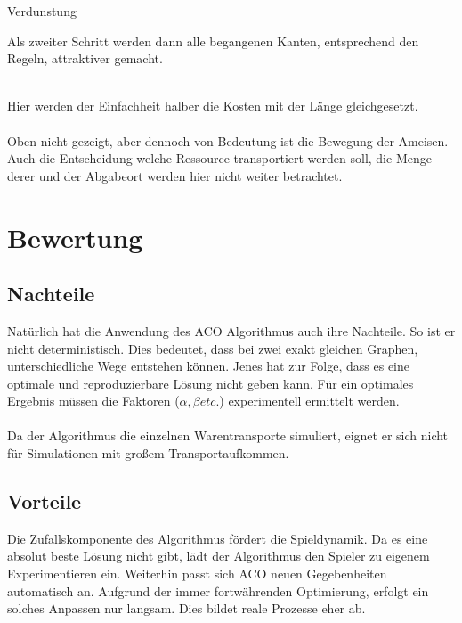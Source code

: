 \documentclass[12pt]{article}
\begin{document}
\begin{algorithm}[H]
\caption{Verdunstung}
\end{algorithm}Als zweiter Schritt werden dann alle begangenen Kanten, entsprechend den Regeln, attraktiver gemacht.\\\\
\begin{algorithm}[H]
\DontPrintSemicolon
{}
\end{algorithm}
Hier werden der Einfachheit halber die Kosten mit der Länge gleichgesetzt.\\\\
Oben nicht gezeigt, aber dennoch von Bedeutung ist die Bewegung der Ameisen. Auch die Entscheidung welche Ressource transportiert werden soll, die Menge derer und der Abgabeort werden hier nicht weiter betrachtet.
\section{Bewertung}
\subsection{Nachteile}\label{Nachteile}
Natürlich hat die Anwendung des ACO Algorithmus auch ihre Nachteile. So ist er nicht deterministisch. Dies bedeutet, dass bei zwei exakt gleichen Graphen, unterschiedliche Wege entstehen können.
Jenes hat zur Folge, dass es eine optimale und reproduzierbare Lösung nicht geben kann. Für ein optimales Ergebnis müssen die Faktoren ($\alpha,\beta etc.$) experimentell ermittelt werden.\\\\
Da der Algorithmus die einzelnen Warentransporte simuliert, eignet er sich nicht für Simulationen mit großem Transportaufkommen.
\subsection{Vorteile}
Die Zufallskomponente des Algorithmus fördert die Spieldynamik. Da es eine absolut beste Lösung nicht gibt, lädt der Algorithmus den Spieler zu eigenem Experimentieren ein.
Weiterhin passt sich ACO neuen Gegebenheiten automatisch an. Aufgrund der immer fortwährenden Optimierung, erfolgt ein solches Anpassen nur langsam. Dies bildet reale Prozesse eher ab.
\end{document}

